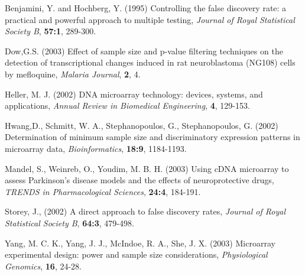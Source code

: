\documentclass{bioinfo}
\begin{document}
\begin{thebibliography}{}

 Benjamini, Y. and Hochberg, Y. (1995)
Controlling the false discovery rate: a practical and powerful
approach to multiple testing, {\it Journal of Royal Statistical
Society B}, {\bf 57:1}, 289-300.

 Dow,G.S. (2003) Effect of sample size and p-value filtering techniques on the detection of transcriptional changes induced in
rat neuroblastoma (NG108) cells by mefloquine, {\it Malaria Journal}, {\bf 2}, 4.

 Heller, M. J. (2002) {DNA microarray technology: devices, systems, and applications},
 {\it Annual Review in Biomedical Engineering}, {\bf 4}, 129-153.

 Hwang,D., Schmitt, W. A., Stephanopoulos, G., Stephanopoulos, G. (2002)
 Determination of minimum sample size and discriminatory expression patterns in microarray data,
 {\it Bioinformatics}, {\bf 18:9}, 1184-1193.

 Mandel, S.,  Weinreb, O., Youdim, M. B. H. (2003)
 Using cDNA microarray to assess Parkinson's disease models and
  the effects of neuroprotective drugs, {\it TRENDS in Pharmacological Sciences}, {\bf 24:4}, 184-191.

 Storey, J., (2002)
A direct approach to false discovery rates, {\it Journal of Royal Statistical Society B}, {\bf 64:3}, 479-498.

 Yang, M. C. K., Yang, J. J., McIndoe, R. A., She, J. X. (2003)
Microarray experimental design: power and sample size considerations, {\it Physiological Genomics}, {\bf 16}, 24-28.
\end{thebibliography}
\end{document}
